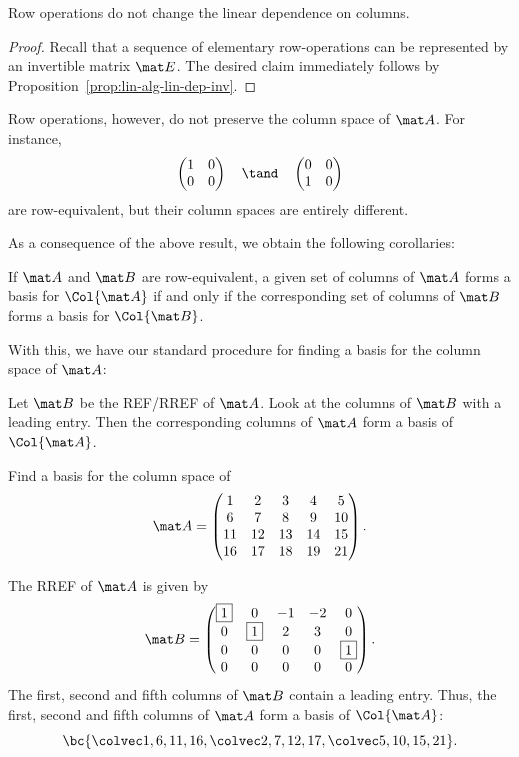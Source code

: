 \begin{proposition}\label{prop:lin-alg:row-lindep}
    Row operations do not change the linear dependence on columns.
\end{proposition}
\begin{proof}
    Recall that a sequence of elementary row-operations can be represented by an invertible matrix $\mat E$. The desired claim immediately follows by Proposition~\ref{prop:lin-alg-lin-dep-inv}.
\end{proof}

Row operations, however, do not preserve the column space of $\mat A$. For instance, \[\begin{pmatrix}1 & 0 \\ 0 & 0\end{pmatrix} \quad \tand \quad \begin{pmatrix}0 & 0 \\ 1 & 0\end{pmatrix}\] are row-equivalent, but their column spaces are entirely different.

As a consequence of the above result, we obtain the following corollaries:
\begin{corollary}
    If $\mat A$ and $\mat B$ are row-equivalent, a given set of columns of $\mat A$ forms a basis for $\Col{\mat A}$ if and only if the corresponding set of columns of $\mat B$ forms a basis for $\Col{\mat B}$.
\end{corollary}

With this, we have our standard procedure for finding a basis for the column space of $\mat A$:

\begin{recipe}
    Let $\mat B$ be the REF/RREF of $\mat A$. Look at the columns of $\mat B$ with a leading entry. Then the corresponding columns of $\mat A$ form a basis of $\Col{\mat A}$.
\end{recipe}

\begin{sample}
    Find a basis for the column space of \[\mat A = \begin{pmatrix}1 & 2 & 3 & 4 & 5 \\ 6 & 7 & 8 & 9 & 10 \\ 11 & 12 & 13 & 14 & 15 \\ 16 & 17 & 18 & 19 & 21\end{pmatrix}.\]
\end{sample}
\begin{sampans}
    The RREF of $\mat A$ is given by \[\mat B = \begin{pmatrix}\boxed{1} & 0 & -1 & -2 & 0 \\ 0 & \boxed{1} & 2 & 3 & 0 \\ 0 & 0 & 0 & 0 & \boxed{1} \\ 0 & 0 & 0 & 0 & 0\end{pmatrix}.\] The first, second and fifth columns of $\mat B$ contain a leading entry. Thus, the first, second and fifth columns of $\mat A$ form a basis of $\Col{\mat A}$: \[\bc{\cveciv16{11}{16}, \cveciv27{12}{17}, \cveciv5{10}{15}{21}}.\]
\end{sampans}


